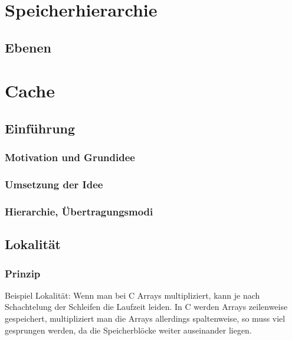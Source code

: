 \section{Speicherhierarchie}

\subsection{Ebenen}

\section{Cache}
\subsection{Einführung}
\subsubsection{Motivation und Grundidee}

\subsubsection{Umsetzung der Idee}

\subsubsection{Hierarchie, Übertragungsmodi}

\subsection{Lokalität}
\subsubsection{Prinzip}
Beispiel Lokalität: Wenn man bei C Arrays multipliziert, kann je nach Schachtelung der Schleifen die Laufzeit leiden. In C werden Arrays zeilenweise gespeichert, multipliziert man die Arrays allerdings spaltenweise, so muss viel gesprungen werden, da die Speicherblöcke weiter auseinander liegen.


